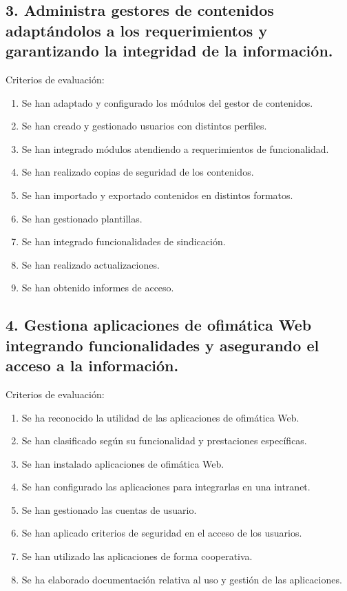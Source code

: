 \documentclass[a4paper]{article}
\begin{document}
\subsection{3. Administra gestores de contenidos adaptándolos a los requerimientos y garantizando la integridad de la información.}
\label{sec:org0000021}
Criterios de evaluación:
\begin{enumerate}
\item Se han adaptado y configurado los módulos del gestor de contenidos.
\item Se han creado y gestionado usuarios con distintos perfiles.
\item Se han integrado módulos atendiendo a requerimientos de funcionalidad.
\item Se han realizado copias de seguridad de los contenidos.
\item Se han importado y exportado contenidos en distintos formatos.
\item Se han gestionado plantillas.
\item Se han integrado funcionalidades de sindicación.
\item Se han realizado actualizaciones.
\item Se han obtenido informes de acceso.
\end{enumerate}
\subsection{4. Gestiona aplicaciones de ofimática Web integrando funcionalidades y asegurando el acceso a la información.}
\label{sec:org0000024}
Criterios de evaluación:
\begin{enumerate}
\item Se ha reconocido la utilidad de las aplicaciones de ofimática Web.
\item Se han clasificado según su funcionalidad y prestaciones específicas.
\item Se han instalado aplicaciones de ofimática Web.
\item Se han configurado las aplicaciones para integrarlas en una intranet.
\item Se han gestionado las cuentas de usuario.
\item Se han aplicado criterios de seguridad en el acceso de los usuarios.
\item Se han utilizado las aplicaciones de forma cooperativa.
\item Se ha elaborado documentación relativa al uso y gestión de las aplicaciones.
\end{enumerate}
\end{document}
